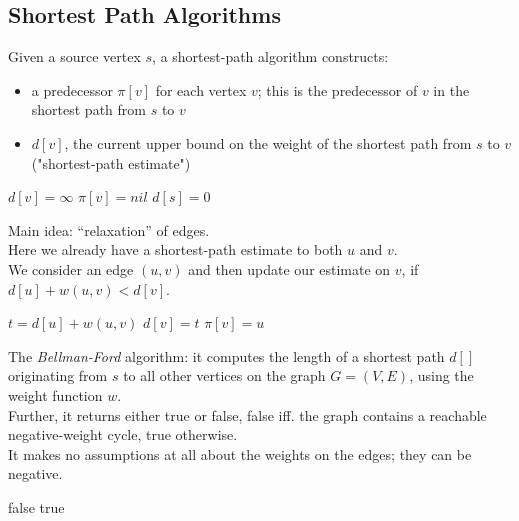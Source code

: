 \documentclass[12pt]{article}
\theoremstyle{plain}
\theoremstyle{definition}
\newcommand{\lecture}[1]{\marginpar{{\footnotesize $\leftarrow$ \underline{#1}}}}
\begin{document}
\subsection{Shortest Path Algorithms}
Given a source vertex $s$, a shortest-path algorithm constructs:
\begin{itemize}
  \item a predecessor $\pi[v]$ for each vertex $v$;
  this is the predecessor of $v$ in the shortest path from $s$ to $v$
  \item $d[v]$, the current upper bound on the weight of the shortest path from $s$ to $v$ ("shortest-path estimate")
\end{itemize}

\begin{algorithmic}
    \State $d[v] = \infty$
    \State $\pi[v] = nil$
  \EndFor
  \State $d[s] = 0$
\EndFunction
\end{algorithmic}
\medskip
Main idea: ``relaxation'' of edges. \\
Here we already have a shortest-path estimate to both $u$ and $v$. \\
We consider an edge $(u,v)$ and then update our estimate on $v$, if $d[u] + w(u, v) < d[v]$.

\begin{algorithmic}
  \State $t = d[u] + w(u, v)$
    \State $d[v] = t$
    \State $\pi[v] = u$
  \EndIf
\EndFunction
\end{algorithmic}
\medskip
The \emph{Bellman-Ford} algorithm: it computes the length of a shortest path $d[]$ originating from $s$ to all other vertices on the graph $G = (V,E)$, using the weight function $w$. \\
Further, it returns either true or false, false iff. the graph contains a reachable negative-weight cycle, true otherwise. \\
It makes no assumptions at all about the weights on the edges;
they can be negative.
\lecture{2016/11/10}
\begin{algorithmic}
  \State {}
      \State {}
    \EndFor
  \EndFor
      \State \Return false
    \EndIf
  \EndFor
  \State \Return true
\EndFunction
\end{algorithmic}
\end{document}
